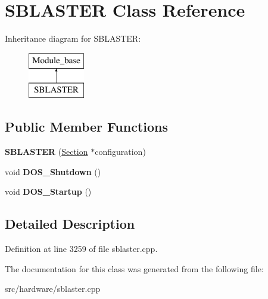 \hypertarget{classSBLASTER}{\section{S\-B\-L\-A\-S\-T\-E\-R Class Reference}
\label{classSBLASTER}
}
Inheritance diagram for S\-B\-L\-A\-S\-T\-E\-R\-:\begin{figure}[H]
\begin{center}
\leavevmode
\includegraphics[height=2.000000cm]{classSBLASTER}
\end{center}
\end{figure}
\subsection*{Public Member Functions}
\begin{DoxyCompactItemize}
\item 
\hypertarget{classSBLASTER_a2e4295f253cbfbfaf7a09f6958ab884c}{{\bfseries S\-B\-L\-A\-S\-T\-E\-R} (\hyperlink{classSection}{Section} $\ast$configuration)}\label{classSBLASTER_a2e4295f253cbfbfaf7a09f6958ab884c}

\item 
\hypertarget{classSBLASTER_a5914aae53429ba3178b2e88015cffd23}{void {\bfseries D\-O\-S\-\_\-\-Shutdown} ()}\label{classSBLASTER_a5914aae53429ba3178b2e88015cffd23}

\item 
\hypertarget{classSBLASTER_a13b1b3922dde7975afc8da6b0967c569}{void {\bfseries D\-O\-S\-\_\-\-Startup} ()}\label{classSBLASTER_a13b1b3922dde7975afc8da6b0967c569}

\end{DoxyCompactItemize}


\subsection{Detailed Description}


Definition at line 3259 of file sblaster.\-cpp.



The documentation for this class was generated from the following file\-:\begin{DoxyCompactItemize}
\item 
src/hardware/sblaster.\-cpp\end{DoxyCompactItemize}
